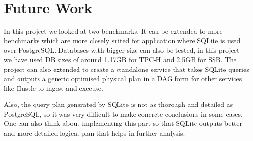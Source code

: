 \section{Future Work}
\label{sec:future}
In this project we looked at two benchmarks. It can be extended to more benchmarks which are more closely suited for application where SQLite is used over PostgreSQL. Databases with bigger size can also be tested, in this project we have used DB sizes of around 1.17GB for TPC-H and 2.5GB for SSB. The project can also extended to create a standalone service that takes SQLite queries and outputs a generic optimised physical plan in a DAG form for other services like Hustle to ingest and execute. 

Also, the query plan generated by SQLite is not as thorough and detailed as PostgreSQL, so it was very difficult to make concrete conclusions in some cases. One can also think about implementing this part so that SQLite outputs better and more detailed logical plan that helps in further analysis.
